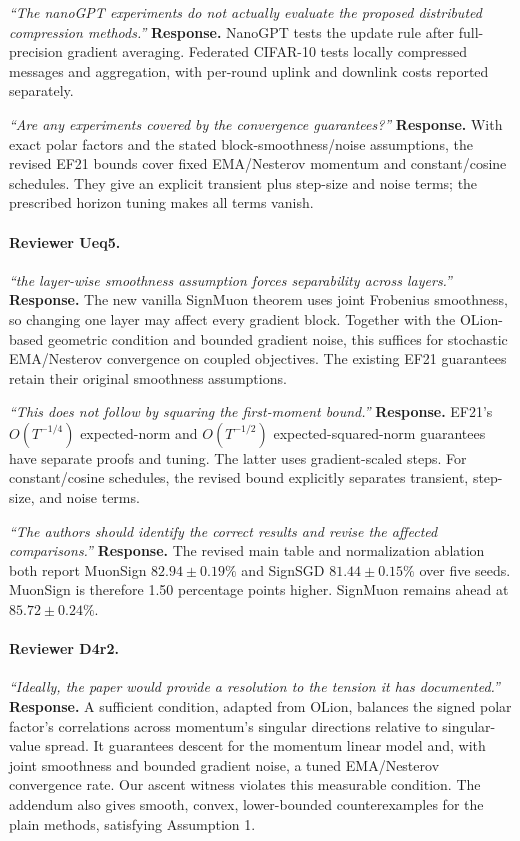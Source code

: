 \noindent\emph{``The nanoGPT experiments do not actually evaluate the proposed distributed compression methods.''}
\textbf{Response.} NanoGPT tests the update rule after full-precision gradient averaging. Federated CIFAR-10 tests locally compressed messages and aggregation, with per-round uplink and downlink costs reported separately.

\noindent\emph{``Are any experiments covered by the convergence guarantees?''}
\textbf{Response.} With exact polar factors and the stated block-smoothness/noise assumptions, the revised EF21 bounds cover fixed EMA/Nesterov momentum and constant/cosine schedules. They give an explicit transient plus step-size and noise terms; the prescribed horizon tuning makes all terms vanish.

\paragraph{Reviewer Ueq5.}
\noindent\emph{``the layer-wise smoothness assumption forces separability across layers.''}
\textbf{Response.} The new vanilla SignMuon theorem uses joint Frobenius smoothness, so changing one layer may affect every gradient block. Together with the OLion-based geometric condition and bounded gradient noise, this suffices for stochastic EMA/Nesterov convergence on coupled objectives. The existing EF21 guarantees retain their original smoothness assumptions.

\noindent\emph{``This does not follow by squaring the first-moment bound.''}
\textbf{Response.} EF21's $O(T^{-1/4})$ expected-norm and $O(T^{-1/2})$ expected-squared-norm guarantees have separate proofs and tuning. The latter uses gradient-scaled steps. For constant/cosine schedules, the revised bound explicitly separates transient, step-size, and noise terms.

\noindent\emph{``The authors should identify the correct results and revise the affected comparisons.''}
\textbf{Response.} The revised main table and normalization ablation both report MuonSign $82.94\pm0.19\%$ and SignSGD $81.44\pm0.15\%$ over five seeds. MuonSign is therefore 1.50 percentage points higher. SignMuon remains ahead at $85.72\pm0.24\%$.

\paragraph{Reviewer D4r2.}
\noindent\emph{``Ideally, the paper would provide a resolution to the tension it has documented.''}
\textbf{Response.} A sufficient condition, adapted from OLion, balances the signed polar factor's correlations across momentum's singular directions relative to singular-value spread. It guarantees descent for the momentum linear model and, with joint smoothness and bounded gradient noise, a tuned EMA/Nesterov convergence rate. Our ascent witness violates this measurable condition. The addendum also gives smooth, convex, lower-bounded counterexamples for the plain methods, satisfying Assumption 1.

